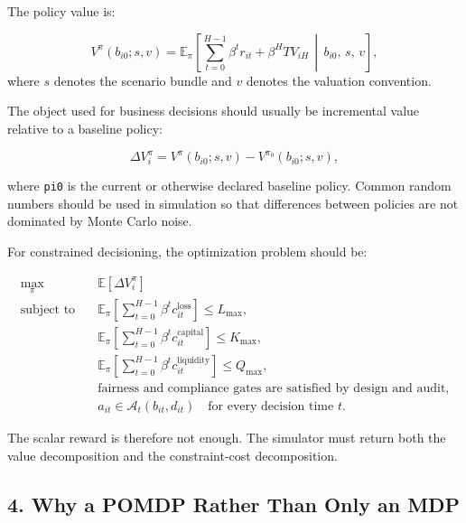 \documentclass[
]{article}
\newcommand{\E}{\mathbb{E}}
\begin{document}
The policy value is:

\begin{equation}
  V^{\pi}(b_{i0};s,v)
  =
  \E_{\pi}\!\left[
    \sum_{t=0}^{H-1}\beta^{t} r_{it}
    + \beta^{H}TV_{iH}
    \,\middle|\, b_{i0},\,s,\,v
  \right],
  \label{eq:policy-value}
\end{equation}
where $s$ denotes the scenario bundle and $v$ denotes the valuation convention.

The object used for business decisions should usually be incremental
value relative to a baseline policy:

\begin{equation}
  \Delta V^{\pi}_{i}
  =
  V^{\pi}(b_{i0};s,v)
  -
  V^{\pi_0}(b_{i0};s,v),
  \label{eq:incremental-policy-value}
\end{equation}

where \texttt{pi0} is the current or otherwise declared baseline policy.
Common random numbers should be used in simulation so that differences
between policies are not dominated by Monte Carlo noise.

For constrained decisioning, the optimization problem should be:

\begin{align}
  \max_{\pi}\quad
    & \E\!\left[\Delta V^{\pi}_{i}\right] \label{eq:constrained-mdp-objective}\\
  \text{subject to}\quad
    & \E_{\pi}\!\left[\sum_{t=0}^{H-1}\beta^t c^{\mathrm{loss}}_{it}\right]
      \le L_{\max}, \nonumber\\
    & \E_{\pi}\!\left[\sum_{t=0}^{H-1}\beta^t c^{\mathrm{capital}}_{it}\right]
      \le K_{\max}, \nonumber\\
    & \E_{\pi}\!\left[\sum_{t=0}^{H-1}\beta^t c^{\mathrm{liquidity}}_{it}\right]
      \le Q_{\max}, \nonumber\\
    & \text{fairness and compliance gates are satisfied by design and audit}, \nonumber\\
    & a_{it}\in \mathcal{A}_{t}(b_{it},d_{it}) \quad \text{for every decision time }t. \nonumber
\end{align}

The scalar reward is therefore not enough. The simulator must return
both the value decomposition and the constraint-cost decomposition.

\hypertarget{why-a-pomdp-rather-than-only-an-mdp}{%
\subsection{4. Why a POMDP Rather Than Only an
MDP}\label{why-a-pomdp-rather-than-only-an-mdp}}
\end{document}
